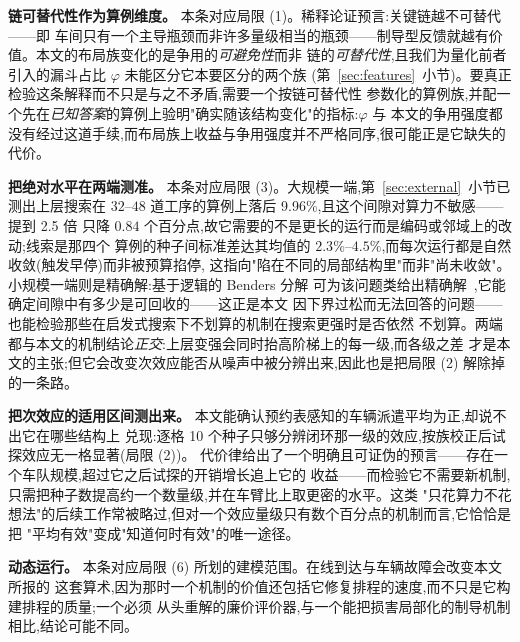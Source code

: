 \documentclass[manuscript,screen,review]{acmart}
\newcommand{\NSeeds}{10}
\newcommand{\PubGapBig}{9.96\%}           %
\newcommand{\PubBudgetRatio}{2.5}
\newcommand{\PubBudgetGainPP}{0.84}       %
\newcommand{\PubCvBig}{$2.3\%$--$4.5\%$} %
\begin{document}
\textbf{链可替代性作为算例维度。} 本条对应局限 (1)。稀释论证预言:关键链越不可替代——即
车间只有一个主导瓶颈而非许多量级相当的瓶颈——制导型反馈就越有价值。本文的布局族变化的是争用的\emph{可避免性}而非
链的\emph{可替代性},且我们为量化前者引入的漏斗占比 $\varphi$ 未能区分它本要区分的两个族
(第~\ref{sec:features}~小节)。要真正检验这条解释而不只是与之不矛盾,需要一个按链可替代性
参数化的算例族,并配一个先在\emph{已知答案}的算例上验明"确实随该结构变化"的指标:$\varphi$ 与
本文的争用强度都没有经过这道手续,而布局族上收益与争用强度并不严格同序,很可能正是它缺失的代价。

\textbf{把绝对水平在两端测准。} 本条对应局限 (3)。大规模一端,第~\ref{sec:external}~小节已测出上层搜索在
$32$--$48$ 道工序的算例上落后 \PubGapBig{},且这个间隙对算力不敏感——提到 \PubBudgetRatio{} 倍
只降 $\PubBudgetGainPP$ 个百分点,故它需要的不是更长的运行而是编码或邻域上的改动;线索是那四个
算例的种子间标准差达其均值的 \PubCvBig{},而每次运行都是自然收敛(触发早停)而非被预算掐停,
这指向"陷在不同的局部结构里"而非"尚未收敛"。小规模一端则是精确解:基于逻辑的 Benders 分解
可为该问题类给出精确解~\cite{vanos2026exact},它能确定间隙中有多少是可回收的——这正是本文
因下界过松而无法回答的问题——也能检验那些在启发式搜索下不划算的机制在搜索更强时是否依然
不划算。两端都与本文的机制结论\emph{正交}:上层变强会同时抬高阶梯上的每一级,而各级之差
才是本文的主张;但它会改变次效应能否从噪声中被分辨出来,因此也是把局限 (2) 解除掉的一条路。

\textbf{把次效应的适用区间测出来。} 本文能确认预约表感知的车辆派遣平均为正,却说不出它在哪些结构上
兑现:逐格 \NSeeds{} 个种子只够分辨闭环那一级的效应,按族校正后试探效应无一格显著(局限 (2))。
代价律给出了一个明确且可证伪的预言——存在一个车队规模,超过它之后试探的开销增长追上它的
收益——而检验它不需要新机制,只需把种子数提高约一个数量级,并在车臂比上取更密的水平。这类
"只花算力不花想法"的后续工作常被略过,但对一个效应量级只有数个百分点的机制而言,它恰恰是把
"平均有效"变成"知道何时有效"的唯一途径。

\textbf{动态运行。} 本条对应局限 (6) 所划的建模范围。在线到达与车辆故障会改变本文所报的
这套算术,因为那时一个机制的价值还包括它修复排程的速度,而不只是它构建排程的质量;一个必须
从头重解的廉价评价器,与一个能把损害局部化的制导机制相比,结论可能不同。







\end{document}
